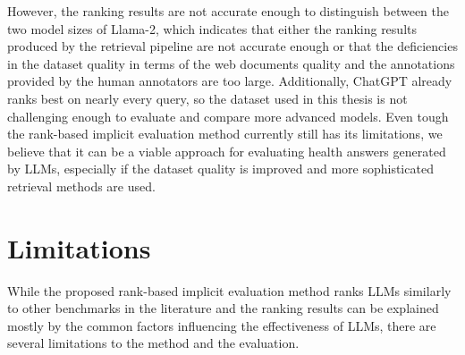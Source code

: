 However, the ranking results are not accurate enough to distinguish between the two model sizes of Llama-2, which indicates that either the ranking results produced by the retrieval pipeline are not accurate enough or that the deficiencies in the dataset quality in terms of the web documents quality and the annotations provided by the human annotators are too large.
Additionally, ChatGPT already ranks best on nearly every query, so the dataset used in this thesis is not challenging enough to evaluate and compare more advanced models.
Even tough the rank-based implicit evaluation method currently still has its limitations, we believe that it can be a viable approach for evaluating health answers generated by LLMs, especially if the dataset quality is improved and more sophisticated retrieval methods are used.

\section{Limitations}
While the proposed rank-based implicit evaluation method ranks LLMs similarly to other benchmarks in the literature and the ranking results can be explained mostly by the common factors influencing the effectiveness of LLMs, there are several limitations to the method and the evaluation.


